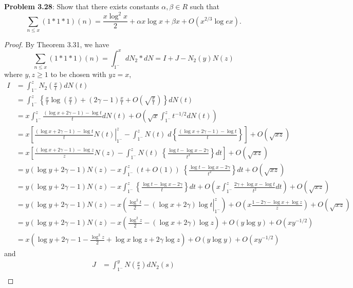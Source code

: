 \documentclass[12pt]{article}
\begin{document}
\fi

\textbf{Problem 3.28}: Show that there exists constants $\alpha, \beta \in R$ such that
$$\sum_{n \leq x} (1 * 1 * 1)(n) = \frac{x \log^2 x}{2} + \alpha x \log x + \beta x + O(x^{2/3} \log ex).$$

\begin{proof}
By Theorem 3.31, we have
$$\sum_{n \leq x} (1 * 1 * 1)(n) = \int_{1^-}^x dN_2 * dN = I + J - N_2(y) N(z)$$
where $y, z \geq 1$ to be chosen with $yz = x$,
\begin{align*}
I &= \int_{1^-}^z N_2\left(\frac{x}{t} \right) dN(t) \\
&= \int_{1^-}^z \left\{\frac{x}{t} \log \left(\frac{x}{t}\right) + (2 \gamma - 1)\frac{x}{t} + O\left(\sqrt{\frac{x}{t}}\right) \right\} dN(t) \\
&= x \int_{1^-}^z \frac{(\log x + 2 \gamma - 1) - \log t}{t} dN(t) + O\left(\sqrt{x} \int_{1^-}^z t^{-1/2} dN(t)\right)\\
&= x \left[ \left. \frac{(\log x + 2 \gamma - 1) - \log t}{t} N(t) \right|_{1^-}^{z} - \int_{1^-}^z N(t) \; d\left\{ \frac{(\log x + 2 \gamma - 1) - \log t}{t} \right\} \right] + O(\sqrt{xz})\\
&= x \left[ \frac{(\log x + 2 \gamma - 1) - \log z}{z} N(z) - \int_{1^-}^z N(t) \; \left\{ \frac{\log t - \log x - 2 \gamma}{t^2} \right\} dt \right] + O(\sqrt{xz})\\
&= y (\log y + 2 \gamma - 1) N(z) - x \int_{1^-}^z (t + O(1)) \; \left\{ \frac{\log t - \log x - 2 \gamma}{t^2} \right\} dt + O(\sqrt{xz})\\
&= y (\log y + 2 \gamma - 1) N(z) - x \int_{1^-}^z \left\{ \frac{\log t - \log x - 2 \gamma}{t} \right\} dt + O\left(x \int_{1^-}^z \frac{2\gamma + \log x - \log t}{t^2} dt\right) + O(\sqrt{xz})\\
&= y (\log y + 2 \gamma - 1) N(z) - x \left( \left. \frac{\log^2 t}{2} - (\log x + 2 \gamma)\log t \right|_{1^-}^z \right) + O\left(x \frac{1 - 2 \gamma - \log x + \log z}{z} \right) + O(\sqrt{xz})\\
&= y (\log y + 2 \gamma - 1) N(z) - x \left(\frac{\log^2 z}{2} - (\log x + 2 \gamma)\log z  \right) + O\left(y \log y \right) + O(x y^{-1/2})\\
&= x \left(\log y + 2 \gamma - 1 - \frac{\log^2 z}{2} + \log x \log z + 2 \gamma \log z  \right) + O\left(y \log y \right) + O(x y^{-1/2})
\end{align*}
and
\begin{align*}
J &= \int_{1^-}^y N\left(\frac{x}{s}\right) dN_2(s) \\

\end{align*}
\end{proof}
\end{document}
